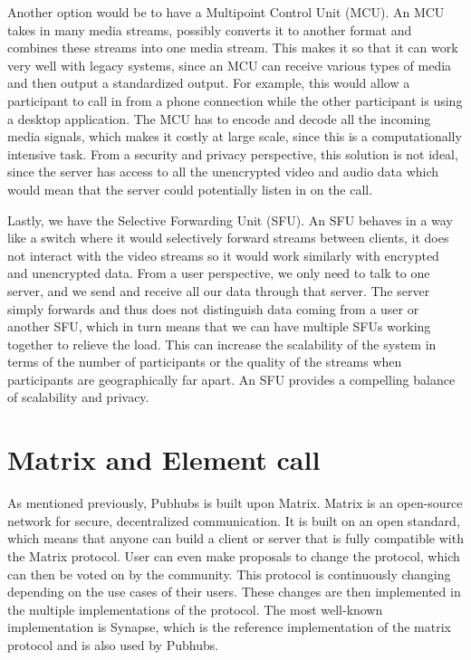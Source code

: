 \documentclass{report}
\begin{document}
Another option would be to have a Multipoint Control Unit (MCU). An MCU takes in many media streams, possibly
converts it to another format and combines these streams into one media stream. This makes it so that it can work
very well with legacy systems, since an MCU can receive various types of media and then output a standardized
output. For example, this would allow a participant to call in from a phone connection while the other participant
is using a desktop application. The MCU has to encode and decode all the incoming media signals, which makes it
costly at large scale, since this is a computationally intensive task. From a security and privacy perspective, this
solution is not ideal, since the server has access to all the unencrypted video and audio data which would mean that
the server could potentially listen in on the call.

Lastly, we have the Selective Forwarding Unit (SFU). An SFU behaves in a way like a switch where it would
selectively forward streams between clients, it does not interact with the video streams so it would work similarly
with encrypted and unencrypted data. From a user perspective, we only need to talk to one server, and we send and
receive all our data through that server. The server simply forwards and thus does not distinguish data coming from
a user or another SFU, which in turn means that we can have multiple SFUs working together to relieve the load. This
can increase the scalability of the system in terms of the number of participants or the quality of the streams when
participants are geographically far apart. An SFU provides a compelling balance of scalability and privacy.


\section{Matrix and Element call}
As mentioned previously, Pubhubs is built upon Matrix. Matrix is an open-source network for secure, decentralized
communication. It is built on an open standard, which means that anyone can build a client or server that is fully
compatible with the Matrix protocol. User can even make proposals to change the protocol, which can then be voted on
by the community. This protocol is continuously changing depending on the use cases of their users. These changes
are then implemented in the multiple implementations of the protocol. The most well-known implementation is Synapse,
which is the reference implementation of the matrix protocol and is also used by Pubhubs.
\end{document}
